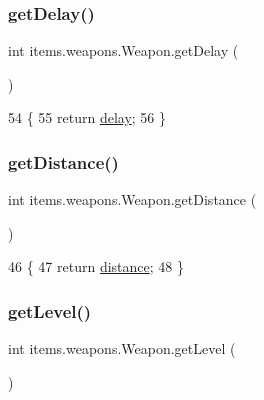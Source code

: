 \subsubsection{\texorpdfstring{get\+Delay()}{getDelay()}}
{\footnotesize\ttfamily int items.\+weapons.\+Weapon.\+get\+Delay (\begin{DoxyParamCaption}{ }\end{DoxyParamCaption})\hspace{0.3cm}{\ttfamily [inline]}}


\begin{DoxyCode}
54                           \{
55         \textcolor{keywordflow}{return} \mbox{\hyperlink{classitems_1_1weapons_1_1_weapon_acf51fcf734c1ce98cbc6d1c2912e8058}{delay}};
56     \}
\end{DoxyCode}
\mbox{\label{classitems_1_1weapons_1_1_weapon_a4cc44ba68fb6d469b39ccdbd0fd418b6}} 
\subsubsection{\texorpdfstring{get\+Distance()}{getDistance()}}
{\footnotesize\ttfamily int items.\+weapons.\+Weapon.\+get\+Distance (\begin{DoxyParamCaption}{ }\end{DoxyParamCaption})\hspace{0.3cm}{\ttfamily [inline]}}


\begin{DoxyCode}
46                              \{
47         \textcolor{keywordflow}{return} \mbox{\hyperlink{classitems_1_1weapons_1_1_weapon_a125dc77704bbb1758d35f282802dcb8d}{distance}};
48     \}
\end{DoxyCode}
\mbox{\label{classitems_1_1weapons_1_1_weapon_af054e780a042127d21810e4a9c7fa75a}} 
\subsubsection{\texorpdfstring{get\+Level()}{getLevel()}}
{\footnotesize\ttfamily int items.\+weapons.\+Weapon.\+get\+Level (\begin{DoxyParamCaption}{ }\end{DoxyParamCaption})\hspace{0.3cm}{\ttfamily [inline]}}


